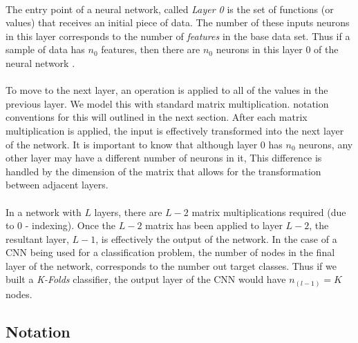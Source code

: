 \documentclass[12pt,letterpaper]{article}
\begin{document}
\paragraph*{}The entry point of a neural network, called \textit{Layer 0} is the set of functions (or values) that receives an initial piece of data. The number of these inputs neurons in this layer corresponds to the number of \textit{features} in the base data set. Thus if a sample of data has $n_0$ features, then there are $n_0$ neurons in this layer 0 of the neural network \cite{Geron}.
\paragraph*{}To move to the next layer, an operation is applied to all of the values in the previous layer. We model this with standard matrix multiplication. notation conventions for this will outlined in the next section. After each matrix multiplication is applied, the input is effectively transformed into the next layer of the network. It is important to know that although layer 0 has $n_0$ neurons, any other layer may have a different number of neurons in it, This difference is handled by the dimension of the matrix that allows for the transformation between adjacent layers.
\paragraph*{}In a network with $L$ layers, there are $L-2$ matrix multiplications required (due to $0$ - indexing). Once the $L-2$ matrix has been applied to  layer $L-2$, the resultant layer, $L-1$, is effectively the output of the network.  In the case of a CNN being used for a classification problem, the number of nodes in the final layer of the network, corresponds to the number out target classes. Thus if we built a \textit{K-Folds} classifier, the output layer of the CNN would have $n_{(l-1)} = K$ nodes.

\subsection{Notation}
\end{document}
